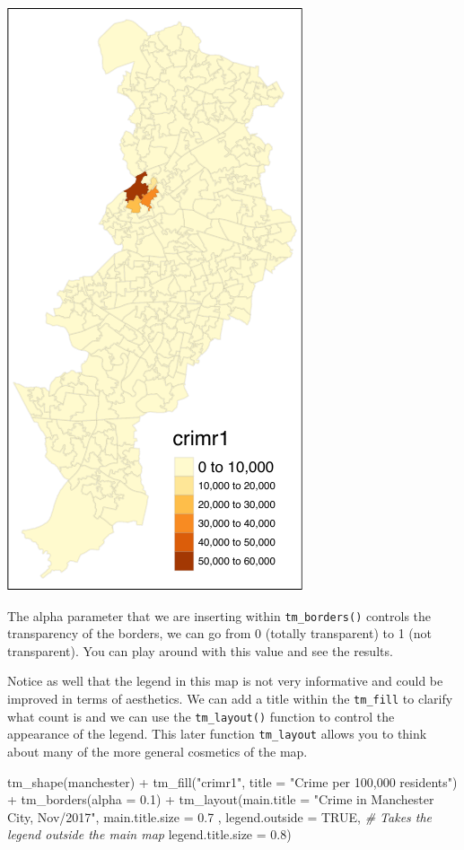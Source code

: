 \documentclass[
]{book}
\newenvironment{Shaded}{\begin{snugshade}}{\end{snugshade}}
\newcommand{\AttributeTok}[1]{\textcolor[rgb]{0.77,0.63,0.00}{#1}}
\newcommand{\CommentTok}[1]{\textcolor[rgb]{0.56,0.35,0.01}{\textit{#1}}}
\newcommand{\ConstantTok}[1]{\textcolor[rgb]{0.00,0.00,0.00}{#1}}
\newcommand{\FloatTok}[1]{\textcolor[rgb]{0.00,0.00,0.81}{#1}}
\newcommand{\FunctionTok}[1]{\textcolor[rgb]{0.00,0.00,0.00}{#1}}
\newcommand{\NormalTok}[1]{#1}
\newcommand{\SpecialCharTok}[1]{\textcolor[rgb]{0.00,0.00,0.00}{#1}}
\newcommand{\StringTok}[1]{\textcolor[rgb]{0.31,0.60,0.02}{#1}}
\begin{document}
\includegraphics{crime_mapping_files/figure-latex/unnamed-chunk-86-1.pdf}

The alpha parameter that we are inserting within \texttt{tm\_borders()} controls the transparency of the borders, we can go from 0 (totally transparent) to 1 (not transparent). You can play around with this value and see the results.

Notice as well that the legend in this map is not very informative and could be improved in terms of aesthetics. We can add a title within the \texttt{tm\_fill} to clarify what count is and we can use the \texttt{tm\_layout()} function to control the appearance of the legend. This later function \texttt{tm\_layout} allows you to think about many of the more general cosmetics of the map.

\begin{Shaded}
\begin{Highlighting}[]
\FunctionTok{tm\_shape}\NormalTok{(manchester) }\SpecialCharTok{+} 
  \FunctionTok{tm\_fill}\NormalTok{(}\StringTok{"crimr1"}\NormalTok{, }\AttributeTok{title =} \StringTok{"Crime per 100,000 residents"}\NormalTok{) }\SpecialCharTok{+}
  \FunctionTok{tm\_borders}\NormalTok{(}\AttributeTok{alpha =} \FloatTok{0.1}\NormalTok{) }\SpecialCharTok{+}
  \FunctionTok{tm\_layout}\NormalTok{(}\AttributeTok{main.title =} \StringTok{"Crime in Manchester City, Nov/2017"}\NormalTok{, }
            \AttributeTok{main.title.size =} \FloatTok{0.7}\NormalTok{ ,}
            \AttributeTok{legend.outside =} \ConstantTok{TRUE}\NormalTok{,  }\CommentTok{\# Takes the legend outside the main map }
            \AttributeTok{legend.title.size =} \FloatTok{0.8}\NormalTok{)}
\end{Highlighting}
\end{Shaded}
\end{document}
